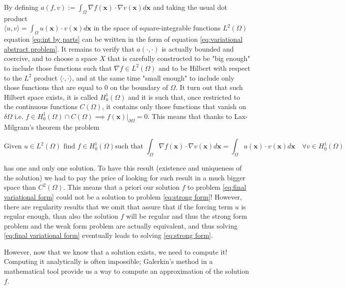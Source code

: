 By defining $a(f, v):=	\int_\Omega \nabla f(\mathbf x)\cdot\nabla v(\mathbf x) d\mathbf x $ and taking the usual dot product \\$\langle u, v\rangle = \int_\Omega  u(\mathbf x)\cdot v(\mathbf x)d\mathbf x$ in the space of square-integrable functions $L^2(\Omega)$ equation \ref{eq:int by parts} can be written in the form of equation \ref{eq:variational abstract problem}. It remains to verify that $a(\cdot, \cdot)$ is actually bounded and coercive, and to choose a space $X$ that is carefully constructed to be "big enough" to include those functions such that $\nabla f \in L^2(\Omega)$ and to be Hilbert with respect to the $L^2$ product $\langle\cdot,\cdot\rangle$, and at the same time "small enough" to include only those functions that are equal to 0 on the boundary of $\Omega$. It turn out that such Hilbert space exists, it is called $H^1_0(\Omega)$ and it is such that, once restricted to the continuous functions $C(\Omega)$, it contains only those functions that vanish on $\delta \Omega$ i.e. $f\in H^1_0(\Omega)\cap C(\Omega) \implies \left.f(\mathbf x)\right|_{\partial\Omega}=0$. This means that thanks to Lax-Milgram's theorem the problem

\begin{equation}\label{eq:final variational form}
	\text{Given }u\in L^2(\Omega)\text{ find }f\in H^1_0(\Omega)\text{such that }\int_\Omega \nabla f(\mathbf x)\cdot\nabla v(\mathbf x) d\mathbf x = \int_\Omega  u(\mathbf x)\cdot v(\mathbf x)d\mathbf x\quad \forall v\in H^1_0(\Omega)
\end{equation}

has one and only one solution. To have this result (existence and uniqueness of the solution) we had to pay the price of looking for such result in a much bigger space than $C^2(\Omega)$. This means that a priori our solution $f$ to problem \ref{eq:final variational form} could not be a solution to problem \ref{eq:strong form}! However, there are regularity results that we omit that assure that if the forcing term $u$ is regular enough, than also the solution $f$ will be regular and thus the strong form problem and the weak form problem are actually equivalent, and thus solving \ref{eq:final variational form} eventually leads to solving \ref{eq:strong form}.

However, now that we know that a solution exists, we need to compute it! Computing it analytically is often impossible; Galerkin's method in a mathematical tool provide us a way to compute an approximation of the solution $f$.

